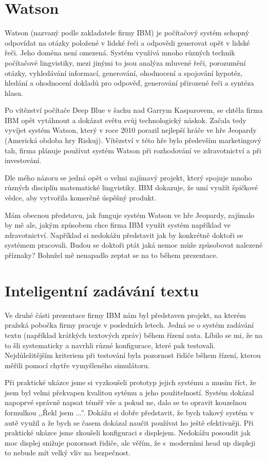 \documentclass[12pt,a4paper]{report}
\begin{document}
\section*{Watson}

Watson (nazvaný podle zakladatele firmy IBM) je počítačový systém schopný
odpovídat na otázky položené v lidské řeči a odpovědi generovat opět v lidské
řeči. Jeho doména není omezená. Systém využívá mnoho různých technik počítačové
lingvistiky, mezi jinými to jsou analýza mluvené řeči, porozumění otázky,
vyhledávání informací, generování, ohodnocení a spojování hypotéz, hledání a
ohodnocení dokladů pro odpověď, generování přirozené řeči a syntéza hlasu.

Po vítězství počítače Deep Blue v šachu nad Garrym Kasparovem, se chtěla firma
IBM opět vytáhnout a dokázat světu svůj technologický náskok. Začala tedy
vyvíjet systém Watson, který v roce 2010 porazil nejlepší hráče ve hře Jeopardy
(Americká obdoba hry Riskuj). Vítězství v této hře bylo především marketingový
tah, firma plánuje používat systém Watson při rozhodování ve zdravotnictví a
při investování.

Dle mého názoru se jedná opět o velmi zajímavý projekt, který spojuje mnoho
různých disciplín matematické lingvistiky. IBM dokazuje, že umí využít
špičkové vědce, aby vytvořila komerčně úspěšný produkt. 

Mám obecnou představu, jak funguje systém Watson ve hře Jeopardy, zajímalo by
mě ale, jakým způsobem chce firma IBM využít systém například ve zdravotnictví.
Například si nedokážu představit jak by konkrétně doktoři se systémem
pracovali. Budou se doktoři ptát jaká nemoc může způsobovat nalezené příznaky?
Bohužel mě nenapadlo zeptat se na to během prezentace. 

\section*{Inteligentní zadávání textu}

Ve druhé části prezentace firmy IBM nám byl představen projekt, na kterém
pražská pobočka firmy pracuje v posledních letech. Jedná se o systém zadávání
textu (například krátkých textových zpráv) během řízení auta. Líbilo se mi, že
na to šli systematicky a navrhli různé konfigurace, které pak testovali.
Nejdůležitějším kriteriem při testování byla pozornost řidiče během řízení,
kterou měřili pomocí chytře vymyšleného simulátoru. 

Při praktické ukázce jsme si vyzkoušeli prototyp jejich systému a musím říct,
že jsem byl velmi překvapen kvalitou sytému a jeho použitelností. Systém
dokázal napoprvé správně napsat téměř vše a pokud ne, dalo se to opravit
kouzelnou formulkou ,,Řekl jsem ...''. Dokážu si dobře představit, že bych
takový systém v autě využil a že bych se časem dokázal naučit používat
ho ještě efektivněji. Při praktické ukázce jsme zkoušeli konfiguraci s
displejem. Nedokážu posoudit jak moc displej snižuje pozornost řidiče, ale
věřím, že s~moderními head up displeji to nebude mít velký vliv na bezpečnost.
\end{document}
